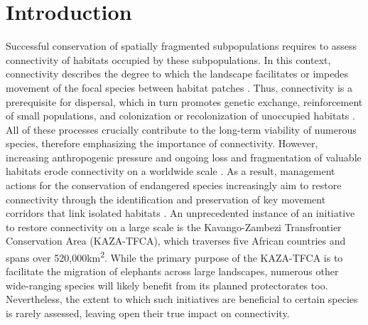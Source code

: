 \documentclass[abstract=on,10pt,a4paper,bibliography=totocnumbered]{scrartcl}
\begin{document}
\onehalfspacing
\tableofcontents
\doublespacing
\newpage


\section{Introduction}
Successful conservation of spatially fragmented subpopulations requires to
assess connectivity of habitats occupied by these subpopulations. In this
context, connectivity describes the degree to which the landscape facilitates or
impedes movement of the focal species between habitat patches
\citep{Taylor.1993, Clobert.2012}. Thus, connectivity is a prerequisite for
dispersal, which in turn promotes genetic exchange, reinforcement of small
populations, and colonization or recolonization of unoccupied habitats
\citep{Brown.1977, Hanski.1998, MacArthur.2001, Frankham.2002, Leigh.2012}. All
of these processes crucially contribute to the long-term viability of numerous
species, therefore emphasizing the importance of connectivity. However,
increasing anthropogenic pressure and ongoing loss and fragmentation of valuable
habitats erode connectivity on a worldwide scale \citep{Fahrig.2003,
Barnosky.2012}. As a result, management actions for the conservation of
endangered species increasingly aim to restore connectivity through the
identification and preservation of key movement corridors that link isolated
habitats \citep{Fahrig.2003, Heller.2009}. An unprecedented instance of an
initiative to restore connectivity on a large scale is the Kavango-Zambezi
Transfrontier Conservation Area (KAZA-TFCA), which traverses five African
countries and spans over 520,000km\textsuperscript{2}. While the primary purpose
of the KAZA-TFCA is to facilitate the migration of elephants across large
landscapes, numerous other wide-ranging species will likely benefit from its
planned protectorates too. Nevertheless, the extent to which such initiatives
are beneficial to certain species is rarely assessed, leaving open their true
impact on connectivity.
\end{document}
